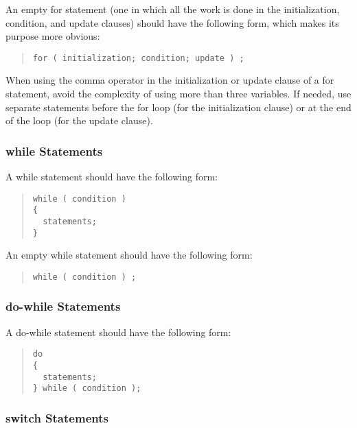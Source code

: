 \documentclass{article}
\begin{document}
An empty for statement (one in which all the work is done in the
initialization, condition, and update clauses) should have the
following form, which makes its purpose more obvious:

\begin{quote}
\begin{verbatim}
for ( initialization; condition; update ) ;
\end{verbatim}
\end{quote}

When using the comma operator in the initialization or update clause
of a for statement, avoid the complexity of using more than three
variables. If needed, use separate statements before the for loop (for
the initialization clause) or at the end of the loop (for the update
clause).

\subsubsection{while Statements}

A while statement should have the following form: 

\begin{quote}
\begin{verbatim}
while ( condition ) 
{
  statements;
}

\end{verbatim}
\end{quote}

An empty while statement should have the following form: 

\begin{quote}
\begin{verbatim}
while ( condition ) ;
\end{verbatim}
\end{quote}

\subsubsection{do-while Statements}

A do-while statement should have the following form: 

\begin{quote}
\begin{verbatim}
do 
{
  statements;
} while ( condition );
\end{verbatim}
\end{quote}

\subsubsection{switch Statements}
\end{document}
